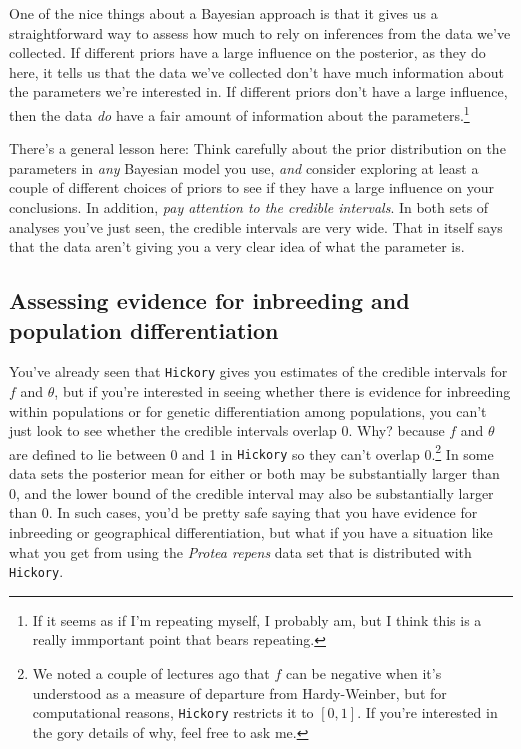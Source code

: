 One of the nice things about a Bayesian approach is that it gives us a
straightforward way to assess how much to rely on inferences from the
data we've collected. If different priors have a large influence on
the posterior, as they do here, it tells us that the data we've
collected don't have much information about the parameters we're
interested in. If different priors don't have a large influence, then
the data {\it do\/} have a fair amount of information about the
parameters.\footnote{If it seems as if I'm repeating myself, I
  probably am, but I think this is a really immportant point that
  bears repeating.} 

There's a general lesson here: Think carefully about the prior
distribution on the parameters in {\it any\/} Bayesian model you use,
{\it and\/} consider exploring at least a couple of different choices
of priors to see if they have a large influence on your
conclusions. In addition, {\it pay attention to the credible
  intervals}. In both sets of analyses you've just seen, the credible
intervals are very wide. That in itself says that the data aren't
giving you a very clear idea of what the parameter is.

\subsection*{Assessing evidence for inbreeding and population
  differentiation}

You've already seen that {\tt Hickory} gives you estimates of the
credible intervals for $f$ and $\theta$, but if you're interested in
seeing whether there is evidence for inbreeding within populations or
for genetic differentiation among populations, you can't just look to
see whether the credible intervals overlap $0$. Why? because $f$ and
$\theta$ are defined to lie between 0 and 1 in {\tt Hickory} so they
can't overlap 0.\footnote{We noted a couple of lectures ago that $f$
  can be negative when it's understood as a measure of departure from
  Hardy-Weinber, but for computational reasons, {\tt Hickory}
  restricts it to $[0,1]$. If you're interested in the gory details of
  why, feel free to ask me.} In some data sets the posterior mean for
either or both may be substantially larger than 0, and the lower bound
of the credible interval may also be substantially larger than 0. In
such cases, you'd be pretty safe saying that you have evidence for
inbreeding or geographical differentiation, but what if you have a
situation like what you get from using the {\it Protea repens\/} data
set that is distributed with {\tt Hickory}.

